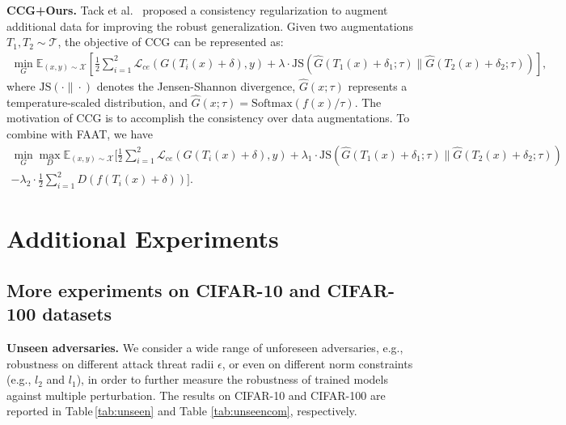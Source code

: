 \documentclass[10pt,twocolumn,letterpaper]{article}
\begin{document}
\noindent\textbf{CCG+Ours.} Tack et al.~\cite{tack2021consistency} proposed a consistency regularization to augment additional data for improving the robust generalization. Given two augmentations $T_1,T_2 \sim \mathcal{T}$, the objective of CCG can be represented as:
\begin{equation}
\begin{aligned}
\label{eq:ob}
		\min _{G} \mathbb{E}_{(x, y) \sim \mathcal{X}}[ \frac{1}{2}\sum_{i=1}^2\mathcal{L}_{ce}(G( T_i(x)+\delta), y)+\lambda \cdot \text{JS}(\hat{G}( T_1(x)+\delta_1;\tau)\|\hat{G}( T_2(x)+\delta_2;\tau))],
\end{aligned}
\end{equation}
where $\text{JS}(\cdot \| \cdot)$ denotes the Jensen-Shannon divergence, $\hat{G}(x; \tau)$ represents a temperature-scaled distribution, and $\hat{G}(x; \tau)=\text{Softmax}(f(x)/\tau)$. The motivation of CCG is to accomplish the consistency over data augmentations. To combine with FAAT, we have
\begin{equation}
\begin{aligned}
\label{eq:ob}
		\min _{G}\max _{D} \mathbb{E}_{(x, y) \sim \mathcal{X}}[ \frac{1}{2}\sum_{i=1}^2\mathcal{L}_{ce}(G(T_i(x)+\delta), y)+\lambda_{1} \cdot \text{JS}(\hat{G}( T_1(x)+\delta_1;\tau)\|\hat{G}( T_2(x)+\delta_2;\tau)) \\
		-\lambda_{2}\cdot \frac{1}{2}\sum_{i=1}^2 D(f(T_i(x)+\delta))].
\end{aligned}
\end{equation}

\section{Additional Experiments}
\subsection{More experiments on CIFAR-10 and CIFAR-100 datasets} 
\noindent\textbf{Unseen adversaries.} We consider a wide range of unforeseen adversaries, e.g., robustness on different attack threat radii $\epsilon$, or even on different norm constraints (e.g., $l_{2}$ and $l_{1}$), in order to further measure the robustness of trained models against multiple perturbation. The results on CIFAR-10 and CIFAR-100 are reported in Table\,\ref{tab:unseen} and Table \ref{tab:unseencom}, respectively. 
\end{document}
